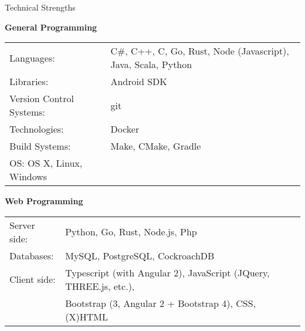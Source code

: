 \documentclass{resume} %
\newcommand{\btab}[2]{
	\bgroup
	\def\arraystretch{#1}
	\begin{tabular}{#2}
}
\newcommand{\etab}{
	\end{tabular} \smallskip
	\egroup
}
\begin{document}
\begin{rSection}{Technical Strengths}

{\bf General Programming}

\btab{1.1}{ l l }
	Languages: &  C\#, C++, C, Go, Rust, Node (Javascript), Java, Scala, Python \\
	Libraries: & Android SDK \\
	Version Control Systems: & git \\
	Technologies: & Docker \\
	Build Systems: & Make, CMake, Gradle \\
	OS: OS X, Linux, Windows \\
\etab

{\bf Web Programming}

\btab{1.1}{ l l }
	Server side: & Python, Go, Rust, Node.js, Php \\
	Databases: & MySQL, PostgreSQL, CockroachDB \\
	Client side: & Typescript (with Angular 2), JavaScript (JQuery, THREE.js, etc.), \\
		& Bootstrap (3, Angular 2 + Bootstrap 4), CSS, (X)HTML \\
\etab

\end{rSection}
\end{document}
